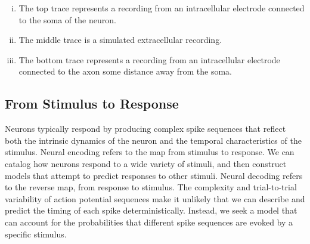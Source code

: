 \begin{enumerate}[(i)]
  \item The top trace represents a recording from an intracellular electrode connected to the soma of the neuron.
  \item The middle trace is a simulated extracellular recording.
  \item The bottom trace represents a recording from an intracellular electrode connected to the axon some distance away from the soma.
\end{enumerate}




\subsection{From Stimulus to Response}
\rem  Neurons typically respond by producing complex spike sequences that reflect both the intrinsic dynamics of the neuron and the temporal characteristics of the stimulus.
 Neural encoding refers to the map from stimulus to response.
\exm We can catalog how neurons respond to a wide variety of stimuli, and then construct models that attempt to predict responses to other stimuli.
 Neural decoding refers to the reverse map, from response to stimulus.
\rem The complexity and trial-to-trial variability of action potential sequences make it unlikely that we can describe and predict the timing of each spike deterministically. Instead, we seek a model that can account for the probabilities that different spike sequences are evoked by a specific stimulus.


